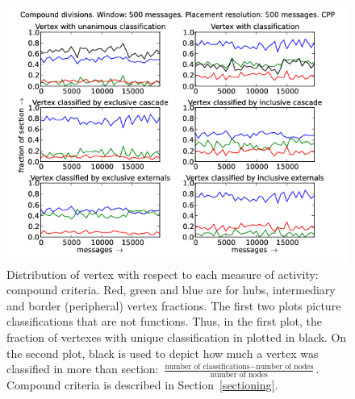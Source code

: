 \documentclass[%
 aip,
 jmp,%
 amsmath,amssymb,
 reprint,%
]{revtex4-1}
\begin{document}
\begin{figure}[hbtp] 
   \centering
        \includegraphics[width=\textwidth]{figs/CPP/500_2}
    \caption{Distribution of vertex with respect to each measure of activity: compound criteria. Red, green and blue are for hubs, intermediary and border (peripheral) vertex fractions. The first two plots picture classifications that are not functions. Thus, in the first plot, the fraction of vertexes with unique classification in plotted in black. On the second plot, black is used to depict how much a vertex was classified in more than section: $\frac{\text{number of classifications} - \text{number of nodes}}{\text{number of nodes}}$. Compound criteria is described in Section~\ref{sectioning}.}
    \label{fig:cpp500_}
\end{figure}
\end{document}
